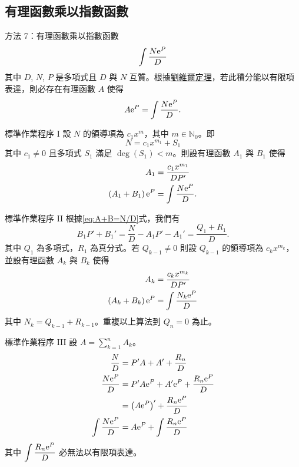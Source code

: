 \documentclass{beamer}
\newcommand{\e}{\textup e}
\newcommand{\N}{\mathbb N}
\theoremstyle{remark}
\begin{document}
\begin{CJK}{UTF8}{bsmi}
\subsection[有理函數乘以指數]{有理函數乘以指數函數}
\begin{frame}{方法 7：有理函數乘以指數函數}
  \[\int \frac{N \e^P}{D}\]
  其中 $D$, $N$, $P$ 是多項式且 $D$ 與 $N$ 互質。根據\href{http://en.wikipedia.org/wiki/Liouville\%27s\textunderscore%
  theorem\textunderscore \%28differential\textunderscore algebra\%29}{劉維爾定理}，若此積分能以有限項表達，則必存在有理函數
  $A$ 使得
  \[A \e^P = \int \frac{N \e^P}{D}.\]
\end{frame}

\begin{frame}{標準作業程序 I}
  設 $N$ 的領導項為 $c_1 x^m$，其中 $m \in \N_0$。即
  \[N = c_1 x^{m_1} + S_1\]
  其中 $c_1 \ne 0$ 且多項式 $S_1$ 滿足 $\deg(S_1) < m$。則設有理函數 $A_1$ 與 $B_1$ 使得
  \begin{align}
    A_1 &= \frac{c_1 x^{m_1}}{DP'} \nonumber \\
    \left( A_1 + B_1 \right) \e^P &= \int \frac{N \e^P}{D}. \label{eq:A+B=N/D}
  \end{align}
\end{frame}

\begin{frame}{標準作業程序 II}
  根據\eqref{eq:A+B=N/D}式，我們有
  \[B_1 P' + B_1' = \frac N D - A_1 P' - A_1' = \frac{Q_1 + R_1}{D}.\]
  其中 $Q_1$ 為多項式，$R_1$ 為真分式。若 $Q_{k-1} \ne 0$ 則設 $Q_{k-1}$ 的領導項為 $c_k x^{m_k}$，並設有理函數
  $A_k$ 與 $B_k$ 使得
  \begin{align*}
    A_k &= \frac{c_k x^{m_k}}{DP'}\\
    \left( A_k + B_k \right) \e^P &= \int \frac{N_k \e^P}{D}
  \end{align*}
  其中 $N_k = Q_{k-1} + R_{k-1}$。重複以上算法到 $Q_n = 0$ 為止。
\end{frame}

\begin{frame}{標準作業程序 III}
  設 $\displaystyle A = \sum_{k=1}^n A_k$。
  \begin{align*}
    \frac N D &= P'A + A' + \frac{R_n}{D}\\
    \frac{N \e^P}{D} &= P'A \e^P + A' \e^P + \frac{R_n \e^P}{D}\\
      &= \left( A \e^P \right)' + \frac{R_n \e^P}{D}\\
    \int \frac{N \e^P}{D} &= A \e^P + \int \frac{R_n \e^P}{D}
  \end{align*}
  其中 $\displaystyle \int \frac{R_n \e^P}{D}$ 必無法以有限項表達。
\end{frame}


\end{CJK}
\end{document}
